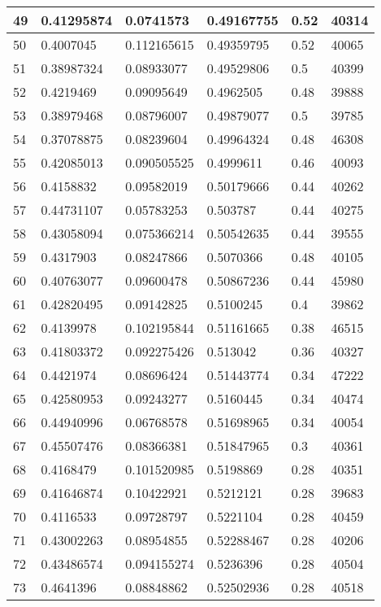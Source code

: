 \begin{longtable}{|l|l|l|l|l|l|}
49 & 0.41295874 & 0.0741573 & 0.49167755 & 0.52 & 40314 \\ \hline 
50 & 0.4007045 & 0.112165615 & 0.49359795 & 0.52 & 40065 \\ \hline 
51 & 0.38987324 & 0.08933077 & 0.49529806 & 0.5 & 40399 \\ \hline 
52 & 0.4219469 & 0.09095649 & 0.4962505 & 0.48 & 39888 \\ \hline 
53 & 0.38979468 & 0.08796007 & 0.49879077 & 0.5 & 39785 \\ \hline 
54 & 0.37078875 & 0.08239604 & 0.49964324 & 0.48 & 46308 \\ \hline 
55 & 0.42085013 & 0.090505525 & 0.4999611 & 0.46 & 40093 \\ \hline 
56 & 0.4158832 & 0.09582019 & 0.50179666 & 0.44 & 40262 \\ \hline 
57 & 0.44731107 & 0.05783253 & 0.503787 & 0.44 & 40275 \\ \hline 
58 & 0.43058094 & 0.075366214 & 0.50542635 & 0.44 & 39555 \\ \hline 
59 & 0.4317903 & 0.08247866 & 0.5070366 & 0.48 & 40105 \\ \hline 
60 & 0.40763077 & 0.09600478 & 0.50867236 & 0.44 & 45980 \\ \hline 
61 & 0.42820495 & 0.09142825 & 0.5100245 & 0.4 & 39862 \\ \hline 
62 & 0.4139978 & 0.102195844 & 0.51161665 & 0.38 & 46515 \\ \hline 
63 & 0.41803372 & 0.092275426 & 0.513042 & 0.36 & 40327 \\ \hline 
64 & 0.4421974 & 0.08696424 & 0.51443774 & 0.34 & 47222 \\ \hline 
65 & 0.42580953 & 0.09243277 & 0.5160445 & 0.34 & 40474 \\ \hline 
66 & 0.44940996 & 0.06768578 & 0.51698965 & 0.34 & 40054 \\ \hline 
67 & 0.45507476 & 0.08366381 & 0.51847965 & 0.3 & 40361 \\ \hline 
68 & 0.4168479 & 0.101520985 & 0.5198869 & 0.28 & 40351 \\ \hline 
69 & 0.41646874 & 0.10422921 & 0.5212121 & 0.28 & 39683 \\ \hline 
70 & 0.4116533 & 0.09728797 & 0.5221104 & 0.28 & 40459 \\ \hline 
71 & 0.43002263 & 0.08954855 & 0.52288467 & 0.28 & 40206 \\ \hline 
72 & 0.43486574 & 0.094155274 & 0.5236396 & 0.28 & 40504 \\ \hline 
73 & 0.4641396 & 0.08848862 & 0.52502936 & 0.28 & 40518 \\ \hline 

\end{longtable}
